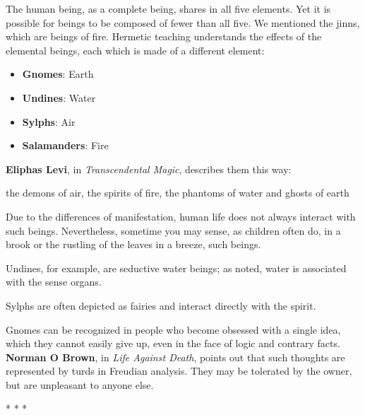 The human being, as a complete being, shares in all five elements. Yet it is possible for beings to be composed of fewer than all five. We mentioned the jinns, which are beings of fire. Hermetic teaching understands the effects of the elemental beings, each which is made of a different element:

\begin{itemize}


\item \textbf{Gnomes}: Earth


\item \textbf{Undines}: Water


\item \textbf{Sylphs}: Air


\item \textbf{Salamanders}: Fire

\end{itemize}


\textbf{Eliphas Levi}, in \emph{Transcendental Magic}, describes them this way:

\begin{quotex}
the demons of air, the spirits of fire, the phantoms of water and ghosts of earth
\end{quotex}


Due to the differences of manifestation, human life does not always interact with such beings. Nevertheless, sometime you may sense, as children often do, in a brook or the rustling of the leaves in a breeze, such beings.

Undines, for example, are seductive water beings; as noted, water is associated with the sense organs.

Sylphs are often depicted as fairies and interact directly with the spirit.

Gnomes can be recognized in people who become obsessed with a single idea, which they cannot easily give up, even in the face of logic and contrary facts. \textbf{Norman O Brown}, in \emph{Life Against Death}, points out that such thoughts are represented by turds in Freudian analysis. They may be tolerated by the owner, but are unpleasant to anyone else.



\begin{center}* * *\end{center}

